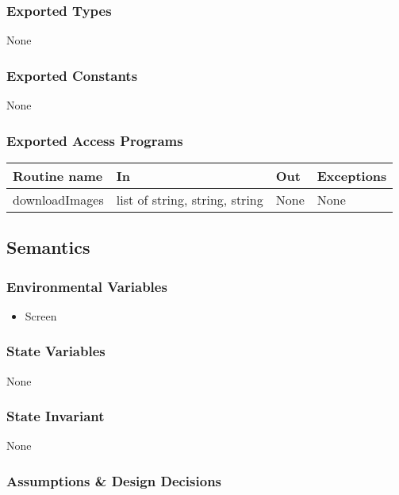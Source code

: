 \documentclass{article}
\begin{document}
\subsubsection* {Exported Types}

None

\subsubsection* {Exported Constants}

None

\subsubsection* {Exported Access Programs}

\begin{tabular}{| l | l | l | p{5cm} |}
\hline
\textbf{Routine name} & \textbf{In} & \textbf{Out} & \textbf{Exceptions}\\
\hline
downloadImages & list of string, string, string & None & None\\
\hline

\end{tabular}

\subsection* {Semantics}

\subsubsection* {Environmental Variables}

\begin{itemize}
\item Screen
\end{itemize}

\subsubsection* {State Variables}

None

\subsubsection* {State Invariant}

None

\subsubsection* {Assumptions \& Design Decisions}
\end{document}
